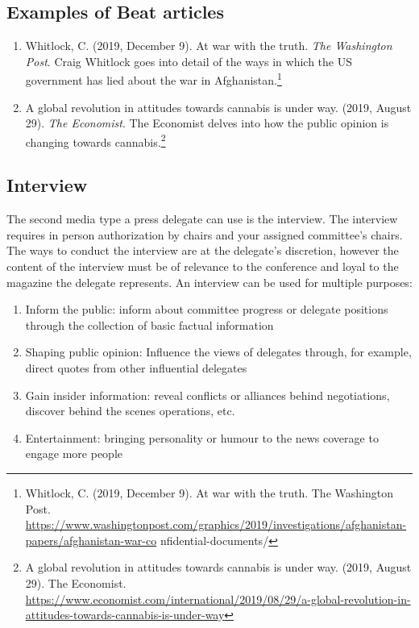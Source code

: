 \subsection{Examples of Beat articles}

\begin{enumerate}
  \item Whitlock, C. (2019, December 9). At war with the truth. \emph{The Washington Post}. Craig Whitlock goes into detail of the ways in which the US government has lied about the war in Afghanistan.\footnote{Whitlock, C. (2019, December 9). At war with the truth. The Washington Post. \url{https://www.washingtonpost.com/graphics/2019/investigations/afghanistan-papers/afghanistan-war-co} nfidential-documents/}
  \item A global revolution in attitudes towards cannabis is under way. (2019, August 29). \emph{The Economist}. The Economist delves into how the public opinion is changing towards cannabis.\footnote{A global revolution in attitudes towards cannabis is under way. (2019, August 29). The Economist. \url{https://www.economist.com/international/2019/08/29/a-global-revolution-in-attitudes-towards-cannabis-is-under-way}}
\end{enumerate}

\subsection{Interview}

The second media type a press delegate can use is the interview. The interview requires in person authorization by chairs and your assigned committee's chairs. The ways to conduct the interview are at the delegate’s discretion, however the content of the interview must be of relevance to the conference and loyal to the magazine the delegate represents. An interview can be used for multiple purposes:

\begin{enumerate}
  \item Inform the public: inform about committee progress or delegate positions through the collection of basic factual information
  \item Shaping public opinion: Influence the views of delegates through, for example, direct quotes from other influential delegates
  \item Gain insider information: reveal conflicts or alliances behind negotiations, discover behind the scenes operations, etc.
  \item Entertainment: bringing personality or humour to the news coverage to engage more people
\end{enumerate}

